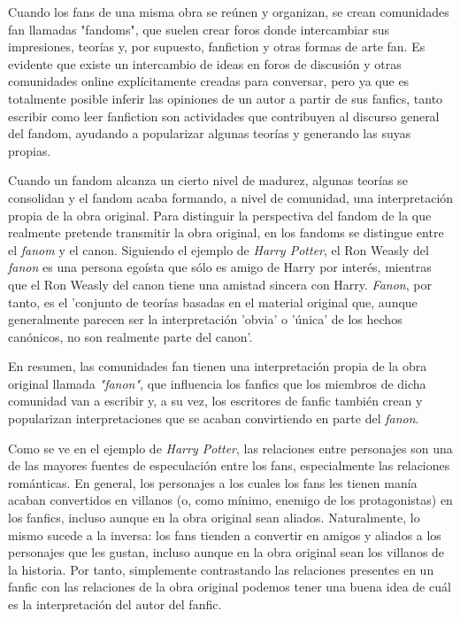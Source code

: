 \documentclass{pre-tfg}
\begin{document}
Cuando los fans de una misma obra se reúnen y organizan, se crean comunidades fan llamadas "fandoms", que suelen crear foros donde intercambiar sus impresiones, teorías y, por supuesto, fanfiction y otras formas de arte fan. Es evidente que existe un intercambio de ideas en foros de discusión y otras comunidades online explícitamente creadas para conversar, pero ya que es totalmente posible inferir las opiniones de un autor a partir de sus fanfics, tanto escribir como leer fanfiction son actividades que contribuyen al discurso general del fandom, ayudando a popularizar algunas teorías y generando las suyas propias.

Cuando un fandom alcanza un cierto nivel de madurez, algunas teorías se consolidan y el fandom acaba formando, a nivel de comunidad, una interpretación propia de la obra original. Para distinguir la perspectiva del fandom de la que realmente pretende transmitir la obra original, en los fandoms se distingue entre el \textit{fanom} y el canon. Siguiendo el ejemplo de \textit{Harry Potter}, el Ron Weasly del \textit{fanon} es una persona egoísta que sólo es amigo de Harry por interés, mientras que el Ron Weasly del canon tiene una amistad sincera con Harry. \textit{Fanon}, por tanto, es el 'conjunto de teorías basadas en el material original que, aunque generalmente parecen ser la interpretación 'obvia' o 'única' de los hechos canónicos, no son realmente parte del canon'\cite{uncanny_2017}.



En resumen, las comunidades fan tienen una interpretación propia de la obra original llamada \textit{"fanon"}, que influencia los fanfics que los miembros de dicha comunidad van a escribir y, a su vez, los escritores de fanfic también crean y popularizan interpretaciones que se acaban convirtiendo en parte del \textit{fanon}.

Como se ve en el ejemplo de \textit{Harry Potter}, las relaciones entre personajes son una de las mayores fuentes de especulación entre los fans, especialmente las relaciones románticas. En general, los personajes a los cuales los fans les tienen manía acaban convertidos en villanos (o, como mínimo, enemigo de los protagonistas) en los fanfics, incluso aunque en la obra original sean aliados. Naturalmente, lo mismo sucede a la inversa: los fans tienden a convertir en amigos y aliados a los personajes que les gustan, incluso aunque en la obra original sean los villanos de la historia. Por tanto, simplemente contrastando las relaciones presentes en un fanfic con las relaciones de la obra original podemos tener una buena idea de cuál es la interpretación del autor del fanfic.
\end{document}
